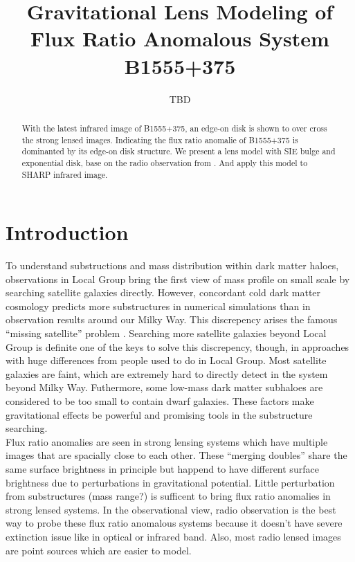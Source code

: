 \documentclass[manuscript]{emulateapj}
\begin{document}
\title{Gravitational Lens Modeling of Flux Ratio Anomalous System B1555+375}
\author{TBD}

\begin{abstract}
With the latest infrared image of B1555+375, an edge-on disk is shown to over cross the strong lensed images. Indicating the flux ratio anomalie of B1555+375 is dominanted by its edge-on disk structure. We present a lens model with SIE bulge and exponential disk, base on the radio observation from \citet{Marlow}. And apply this model to SHARP infrared image.

\end{abstract}


\section{Introduction}
To understand substructions and mass distribution within dark matter haloes, observations in Local Group bring the first view of mass profile on small scale by searching satellite galaxies directly. However, concordant cold dark matter cosmology predicts more substructures in numerical simulations than in observation results around our Milky Way. This discrepency arises the famous ``missing satellite'' problem \citep{Klypin1999}. Searching more satellite galaxies beyond Local Group is definite one of the keys to solve this discrepency, though, in approaches with huge differences from people used to do in Local Group. Most satellite galaxies are faint, which are extremely hard to directly detect in the system beyond Milky Way. Futhermore, some low-mass dark matter subhaloes are considered to be too small to contain dwarf galaxies. These factors make gravitational effects be powerful and promising tools in the substructure searching.\\   
Flux ratio anomalies are seen in strong lensing systems which have multiple images that are spacially close to each other. These ``merging doubles'' share the same surface brightness in principle but happend to have different surface brightness due to perturbations in gravitational potential. Little perturbation from substructures (mass range?) is sufficent to bring flux ratio anomalies in strong lensed systems. In the observational view, radio observation is the best way to probe these flux ratio anomalous systems because it doesn't have severe extinction issue like in optical or infrared band. Also, most radio lensed images are point sources which are easier to model. \\
\end{document}
